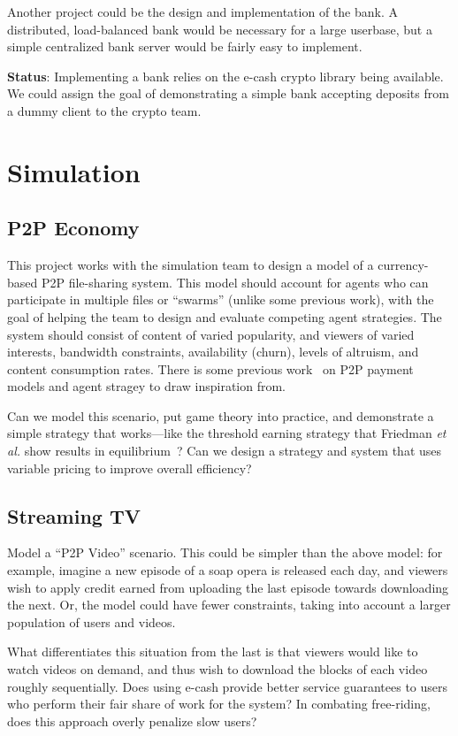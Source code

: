 \documentclass[11pt]{article}
\begin{document}
Another project could be the design and implementation of the bank.  A distributed, load-balanced bank would be necessary for a large userbase, but a simple centralized bank server would be fairly easy to implement.

{\bf Status}: Implementing a bank relies on the e-cash crypto library being available.   We could assign the goal of demonstrating a simple bank accepting deposits from a dummy client to the crypto team.

\section{Simulation}

\subsection{P2P Economy}

This project works with the simulation team to design a model of a currency-based P2P file-sharing system.  This model should account for agents who can participate in multiple files or ``swarms'' (unlike some previous work), with the goal of helping the team to design and evaluate competing agent strategies.  The system should consist of content of varied popularity, and viewers of varied interests, bandwidth constraints, availability (churn), levels of altruism, and content consumption rates.  There is some previous work~\cite{golle,friedman} on P2P payment models and agent stragey to draw inspiration from.

Can we model this scenario, put game theory into practice, and demonstrate a simple strategy that works---like the threshold earning strategy that Friedman {\em et al.} show results in equilibrium~\cite{friedman}?  Can we design a strategy and system that uses variable pricing to improve overall efficiency?

\subsection{Streaming TV}

Model a ``P2P Video'' scenario.  This could be simpler than the above model: for example, imagine a new episode of a soap opera is released each day, and viewers wish to apply credit earned from uploading the last episode towards downloading the next.  Or, the model could have fewer constraints, taking into account a larger population of users and videos.

What differentiates this situation from the last is that viewers would like to watch videos on demand, and thus wish to download the blocks of each video roughly sequentially.  Does using e-cash provide better service guarantees to users who perform their fair share of work for the system?  In combating free-riding, does this approach overly penalize slow users?
\end{document}
